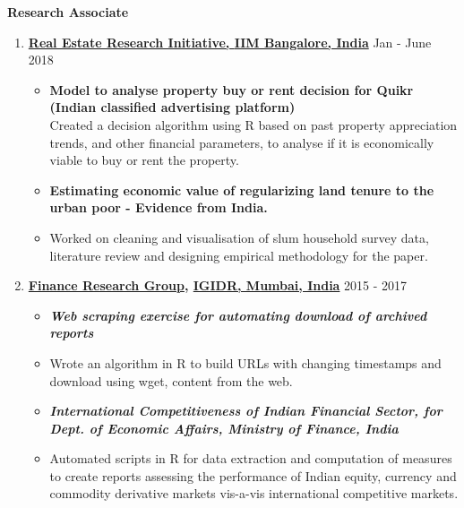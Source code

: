 \documentclass[9pt]{article}
\newenvironment{outerlist}[1][\enskip\textbullet]%
        {\begin{itemize}[#1,leftmargin=*]}{\end{itemize}%
         \vspace{-.5\baselineskip}}
\begin{document}
\textbf{Research Associate}
\begin{enumerate}
  \item \textbf{\href{http://www.iimb.ac.in/node/5501}{Real Estate
      Research Initiative, }\href{http://http://iimb.ac.in/}{IIM
      Bangalore, India}} \hfill {Jan - June 2018}                                                                        
  \begin{outerlist}
    
  \item \textbf{Model to analyse property buy or rent
      decision for Quikr (Indian classified advertising platform)}\\
    Created a decision algorithm using R based on past property
    appreciation trends, and other financial parameters, to 
    analyse if it is economically viable to buy or rent the
    property.
    
  \item  \textbf{Estimating economic value of regularizing land tenure
      to the urban poor - Evidence from India.}
  \item[] Worked on cleaning and visualisation of slum household
    survey data, literature review and designing empirical methodology for
    the paper.
    
  \end{outerlist}
  
\item \textbf{\href{http://www.ifrogs.org/people.html} {Finance Research Group},
    \href{http://www.igidr.ac.in/}{IGIDR, Mumbai, India}} \hfill {2015 - 2017}                                     
  
  \begin{outerlist}                                                                                
  \item \textbf{\textit{Web scraping exercise for automating download
        of archived reports}} %
  \item[] Wrote an algorithm in R to build URLs with changing timestamps
    and download using wget, content from the web. 
    
  \item \textbf{\textit{International Competitiveness of Indian Financial Sector, for
        Dept. of Economic Affairs, Ministry of Finance, India}}  %
    
  \item[] Automated scripts in R for data extraction and computation
    of measures to create reports assessing the performance of
    Indian equity, currency and commodity derivative markets vis-a-vis                            
    international competitive markets.                                    
    

\end{outerlist}
\end{enumerate}
\end{document}

